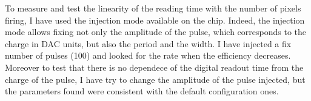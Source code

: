         To measure and test the linearity of the reading time with the number of pixels firing, I have used the injection mode available on the chip. 
        Indeed, the injection mode allows fixing not only the amplitude of the pulse, which corresponds to the charge in DAC units, but also the period and the width.
        I have injected a fix number of pulses (100) and looked for the rate when the efficiency decreases. 
        Moreover to test that there is no dependece of the digital readout time from the charge of the pulse, I have try to change the amplitude of the pulse injected, but the parameters found were consistent with the default configuration ones.

